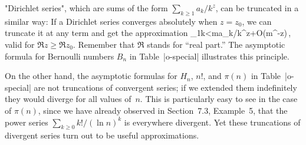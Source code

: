 "Dirichlet series", which are sums of the
form $\sum_{k\ge1} a_k/k^z$, can be truncated in a similar way: If a
Dirichlet series converges absolutely when $z=z_0$, we can truncate
it at any term and get the approximation
\begindisplay
\sum_{1\le k<m}a_k/k^z+O(m^{-z})\,,
\enddisplay
valid for $\Re z\ge\Re z_0$.
\g Remember that\/ $\Re$ stands for ``real part.\qback''\g
The asymptotic formula for Bernoulli numbers $B_n$ in Table~|o-special|
illustrates this principle.

On the other hand, the asymptotic formulas for $H_n$, $n!$, and $\pi(n)$
in Table~|o-special| are not truncations of convergent series;
if we extended them indefinitely they would diverge for all values of~$n$.
This is particularly easy to see in the case of $\pi(n)$, since we have
already observed in Section~7.3, Example~5, that the power series
$\sum_{k\ge0}k!/(\ln n)^k$ is everywhere divergent. Yet these truncations
of divergent series turn out to be useful approximations.

